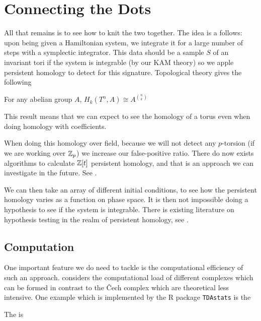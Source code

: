 \documentclass{article}
\begin{document}
\section{Connecting the Dots}
All that remains is to see how to knit the two together. The idea is a follows: upon being given a Hamiltonian system, we integrate it for a large number of steps with a symplectic integrator. This data should be a sample $S$ of an invariant tori if the system is integrable (by our KAM theory) so we apple persistent homology to detect for this signature. Topological theory gives the following
\begin{lemma}
	For any abelian group $A$, $H_k(T^n,A) \cong A^{n \choose k}$
\end{lemma}
This result means that we can expect to see the homology of a torus even when doing homology with coefficients.
\begin{remark}
	When doing this homology over field, because we will not detect any $p$-torsion (if we are working over $\mathbb{Z}_p$) we increase our false-positive ratio. There do now exists algorithms to calculate $\mathbb{Z}[t]$ persistent homology, and that is an approach we can investigate in the future. See \cite{romero2014}.
\end{remark}
 We can then take an array of different initial conditions, to see how the persistent homology varies as a function on phase space. It is then not impossible doing a hypothesis to see if the system is integrable. There is existing literature on hypothesis testing in the realm of persistent homology, see \cite{Robinson2017,fasy2014}.
 \subsection{Computation}
 One important feature we do need to tackle is the computational efficiency of such an approach. \cite{Otter2017} considers the computational load of different complexes which can be formed in contrast to the \v{C}ech complex which are theoretical less intensive. One example which is implemented by the R package \texttt{TDAstats} is the 
 
\begin{definition}
	The  is 
\end{definition}
\end{document}
